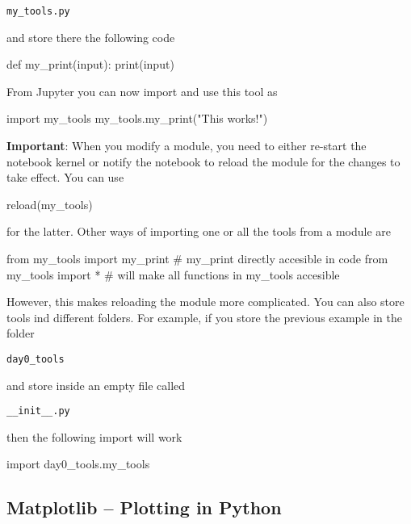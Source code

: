 \begin{verbatim}
my_tools.py
\end{verbatim}

\noindent and store there the following code 

\begin{python}
def my_print(input):
    print(input)
\end{python}

From Jupyter you can now import and use this tool as

\begin{python}
import my_tools
my_tools.my_print("This works!") 
\end{python}

\textbf{Important}: When you modify a module, you need to either re-start the notebook kernel or notify the notebook to reload the module for the changes to take effect. You can use

\begin{python}
reload(my_tools)
\end{python}

\noindent for the latter. Other ways of importing one or all the tools from a module are

\begin{python}
from my_tools import my_print  # my_print directly accesible in code
from my_tools import *         # will make all functions  in my_tools accesible
\end{python}

\noindent However, this makes reloading the module more complicated. You can also store tools ind different folders. For example, if you store the previous
example in the folder

\begin{verbatim}
day0_tools
\end{verbatim}

\noindent and store inside an empty file called  

\begin{verbatim}
__init__.py
\end{verbatim}

\noindent then the following import will work

\begin{python}
import day0_tools.my_tools
\end{python}


\subsection{Matplotlib -- Plotting in Python}

